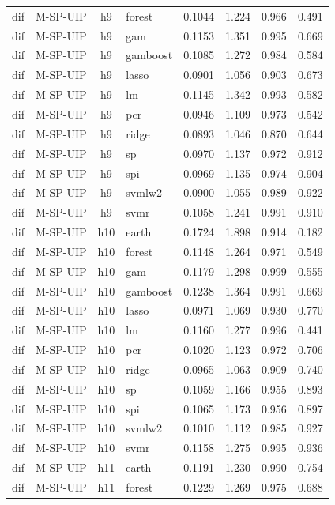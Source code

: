 \begin{ThreePartTable}
\begin{longtable}[t]{llclcccc}
dif & M-SP-UIP & h9 & forest & 0.1044 & 1.224 & 0.966 & 0.491\\
dif & M-SP-UIP & h9 & gam & 0.1153 & 1.351 & 0.995 & 0.669\\
dif & M-SP-UIP & h9 & gamboost & 0.1085 & 1.272 & 0.984 & 0.584\\
dif & M-SP-UIP & h9 & lasso & 0.0901 & 1.056 & 0.903 & 0.673\\
dif & M-SP-UIP & h9 & lm & 0.1145 & 1.342 & 0.993 & 0.582\\
dif & M-SP-UIP & h9 & pcr & 0.0946 & 1.109 & 0.973 & 0.542\\
dif & M-SP-UIP & h9 & ridge & 0.0893 & 1.046 & 0.870 & 0.644\\
dif & M-SP-UIP & h9 & sp & 0.0970 & 1.137 & 0.972 & 0.912\\
dif & M-SP-UIP & h9 & spi & 0.0969 & 1.135 & 0.974 & 0.904\\
dif & M-SP-UIP & h9 & svmlw2 & 0.0900 & 1.055 & 0.989 & 0.922\\
dif & M-SP-UIP & h9 & svmr & 0.1058 & 1.241 & 0.991 & 0.910\\
\addlinespace
dif & M-SP-UIP & h10 & earth & 0.1724 & 1.898 & 0.914 & 0.182\\
dif & M-SP-UIP & h10 & forest & 0.1148 & 1.264 & 0.971 & 0.549\\
dif & M-SP-UIP & h10 & gam & 0.1179 & 1.298 & 0.999 & 0.555\\
dif & M-SP-UIP & h10 & gamboost & 0.1238 & 1.364 & 0.991 & 0.669\\
dif & M-SP-UIP & h10 & lasso & 0.0971 & 1.069 & 0.930 & 0.770\\
dif & M-SP-UIP & h10 & lm & 0.1160 & 1.277 & 0.996 & 0.441\\
dif & M-SP-UIP & h10 & pcr & 0.1020 & 1.123 & 0.972 & 0.706\\
dif & M-SP-UIP & h10 & ridge & 0.0965 & 1.063 & 0.909 & 0.740\\
dif & M-SP-UIP & h10 & sp & 0.1059 & 1.166 & 0.955 & 0.893\\
dif & M-SP-UIP & h10 & spi & 0.1065 & 1.173 & 0.956 & 0.897\\
dif & M-SP-UIP & h10 & svmlw2 & 0.1010 & 1.112 & 0.985 & 0.927\\
dif & M-SP-UIP & h10 & svmr & 0.1158 & 1.275 & 0.995 & 0.936\\
\addlinespace
dif & M-SP-UIP & h11 & earth & 0.1191 & 1.230 & 0.990 & 0.754\\
dif & M-SP-UIP & h11 & forest & 0.1229 & 1.269 & 0.975 & 0.688\\

\end{longtable}
\end{ThreePartTable}
